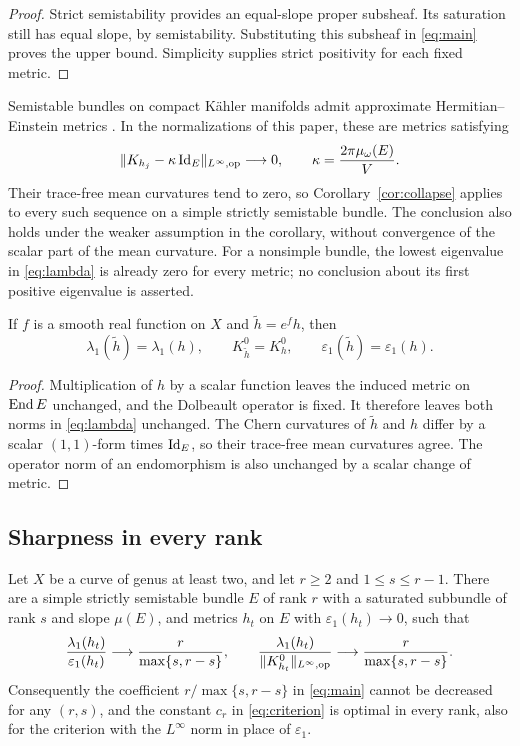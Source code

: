 \begin{proof}
Strict semistability provides an equal-slope proper subsheaf. Its
saturation still has equal slope, by semistability. Substituting this
subsheaf in \eqref{eq:main} proves the upper bound. Simplicity supplies
strict positivity for each fixed metric.
\end{proof}

Semistable bundles on compact K\"ahler manifolds admit approximate
Hermitian--Einstein metrics \cite{Jacob2014}. In the normalizations of
this paper, these are metrics satisfying
\[
 \lVert K_{h_j}-\kappa\operatorname{Id}_E\rVert_{L^\infty,\mathrm{op}}\longrightarrow0,
 \qquad \kappa=\frac{2\pi\mu_\omega(E)}{V}.
\]
Their trace-free mean curvatures tend to zero, so
Corollary~\ref{cor:collapse} applies to every such sequence on a simple
strictly semistable bundle. The conclusion also holds under the weaker
assumption in the corollary, without convergence of the scalar part of
the mean curvature. For a nonsimple bundle, the lowest eigenvalue in
\eqref{eq:lambda} is already zero for every metric; no conclusion about
its first positive eigenvalue is asserted.

\begin{proposition}\label{prop:conformal}
If $f$ is a smooth real function on $X$ and $\widetilde h=e^f h$, then
\[
 \lambda_1(\widetilde h)=\lambda_1(h),\qquad
 K_{\widetilde h}^0=K_h^0,\qquad
 \varepsilon_1(\widetilde h)=\varepsilon_1(h).
\]
\end{proposition}

\begin{proof}
Multiplication of $h$ by a scalar function leaves the induced metric on
$\operatorname{End} E$ unchanged, and the Dolbeault operator is fixed. It therefore
leaves both norms in \eqref{eq:lambda} unchanged. The Chern curvatures
of $\widetilde h$ and $h$ differ by a scalar $(1,1)$-form times
$\operatorname{Id}_E$, so their trace-free mean curvatures agree. The operator norm
of an endomorphism is also unchanged by a scalar change of metric.
\end{proof}

\subsection{Sharpness in every rank}

\begin{corollary}\label{cor:sharpness}
Let $X$ be a curve of genus at least two, and let $r\ge2$ and
$1\le s\le r-1$. There are a simple strictly semistable bundle $E$ of rank
$r$ with a saturated subbundle of rank $s$ and slope $\mu(E)$, and metrics
$h_t$ on $E$ with $\varepsilon_1(h_t)\to0$, such that
\[
 \frac{\lambda_1(h_t)}{\varepsilon_1(h_t)}\longrightarrow\frac r{\max\{s,r-s\}},
 \qquad
 \frac{\lambda_1(h_t)}{\lVert K^0_{h_t}\rVert_{L^\infty,\mathrm{op}}}
 \longrightarrow\frac r{\max\{s,r-s\}}.
\]
Consequently the coefficient $r/\max\{s,r-s\}$ in \eqref{eq:main} cannot be
decreased for any $(r,s)$, and the constant $c_r$ in \eqref{eq:criterion} is
optimal in every rank, also for the criterion with the $L^\infty$ norm in
place of $\varepsilon_1$.
\end{corollary}

